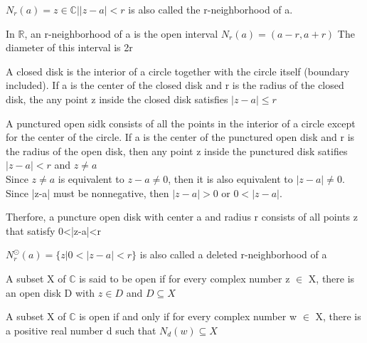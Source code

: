 \documentclass{article}
\begin{document}
\begin{definition}[r-neighborhood of a]
    $ N_r(a) = {z \in \mathbb{C} | |z-a| < r} $ is also called the r-neighborhood of a.
\end{definition}

\begin{definition}[Diameter]
    In $\mathbb{R}$, an r-neighborhood of a is the open interval $N_r(a)=(a-r, a+r)$
    The diameter of this interval is 2r
\end{definition}

\begin{definition}
    A closed disk is the interior of a circle together with the circle itself
    (boundary included). If a is the center of the closed disk and r is the radius
    of the closed disk, the any point z inside the closed disk satisfies
    $ |z-a| \leq r $
\end{definition}

\begin{definition}
    A punctured open sidk consists of all the points in the interior of a circle
    except for the center of the circle. If a is the center of the punctured open
    disk and r is the radius of the open disk, then any point z inside the
    punctured disk satifies $|z-a|<r$ and $z \neq a$\\

    Since $z \neq a$ is equivalent to $z-a \neq 0$, then it is also equivalent to
    $ |z-a| \neq 0$. Since |z-a| must be nonnegative, then $|z-a|>0$ or $ 0<|z-a|$.

    Therfore, a puncture open disk with center a and radius r consists of all
    points z that satisfy 0<|z-a|<r
\end{definition}

\begin{definition}
    $N_{r}^{\odot}(a)=\{z|0<| z-a \mid<r\}$ is also called a deleted r-neighborhood
    of a
\end{definition}

\begin{definition}
    A subset X of $\mathbb{C} $ is said to be open if for every complex number
    z $\in$ X, there is an open disk D with $z \in D$ and $D \subseteq X$
\end{definition}

\begin{theorem}
    A subset X of $\mathbb{C}$ is open if and only if for every complex number
    w $\in$ X, there is a positive real number d such that $N_d(w) \subseteq X$
\end{theorem}
\end{document}
